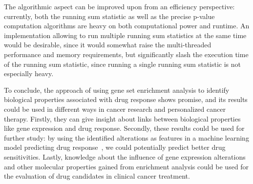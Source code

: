 The algorithmic aspect can be improved upon from an efficiency perspective: currently, both the running sum statistic as well as the precise p-value computation algorithms are heavy on both computational power and runtime. An implementation allowing to run multiple running sum statistics at the same time would be desirable, since it would somewhat raise the multi-threaded performance and memory requirements, but significantly slash the execution time of the running sum statistic, since running a single running sum statistic is not especially heavy.

To conclude, the approach of using gene set enrichment analysis to identify biological properties associated with drug response shows promise, and its results could be used in different ways in cancer research and personalized cancer therapy. Firstly, they can give insight about links between biological properties like gene expression and drug response. Secondly, these results could be used for further study: by using the identified alterations as features in a machine learning model predicting drug response~\cite{drug_sensitivity_prediction_ml_benchmarking}, we could potentially predict better drug sensitivities. Lastly, knowledge about the influence of gene expression alterations and other molecular properties gained from enrichment analysis could be used for the evaluation of drug candidates in clinical cancer treatment.